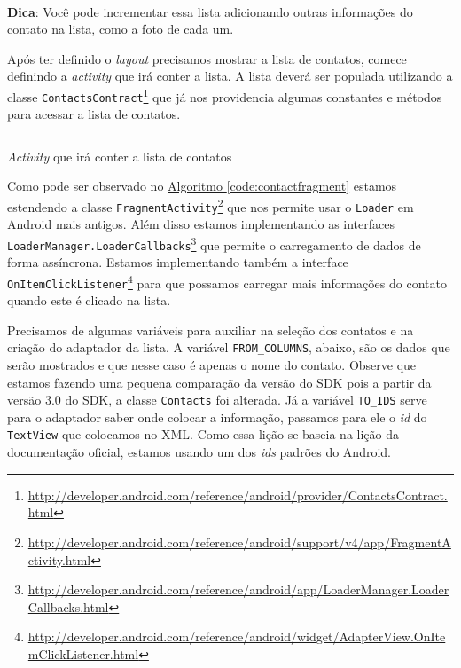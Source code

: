 \documentclass[a4paper,12pt,brazil,oneside]{book}
\begin{document}
\begin{framed}
\paragraph{}\textbf{Dica}: Você pode incrementar essa lista adicionando outras informações do contato na lista, como a foto de cada um.
\textit{}
\end{framed}

	Após ter definido o \emph{layout} precisamos mostrar a lista de contatos, comece definindo a \emph{activity} que irá conter a lista. A lista deverá ser populada utilizando a classe \texttt{ContactsContract}\footnote{\href{http://developer.android.com/reference/android/provider/ContactsContract.html}{http://developer.android.com/reference/android/provider/ContactsContract.html}} que já nos providencia algumas constantes e métodos para acessar a lista de contatos.

		\begin{listing}[H]
		\inputminted[linenos=true,fontsize=\small,frame=lines, framesep=2mm, tabsize=2,numbersep=5pt]{java}{src/api/contacts/fragment.java}
		\caption{\emph{Activity} que irá conter a lista de contatos}
		\label{code:contactfragment}
		\end{listing} 	
	
	Como pode ser observado no \hyperref[code:contactfragment]{Algoritmo \ref*{code:contactfragment}} estamos estendendo a classe \texttt{FragmentActivity}\footnote{\href{http://developer.android.com/reference/android/support/v4/app/FragmentActivity.html}{http://developer.android.com/reference/android/support/v4/app/FragmentActivity.html}} que nos permite usar o \texttt{Loader} em Android mais antigos. Além disso estamos implementando as interfaces \texttt{LoaderManager.LoaderCallbacks}\footnote{\href{http://developer.android.com/reference/android/app/LoaderManager.LoaderCallbacks.html}{http://developer.android.com/reference/android/app/LoaderManager.LoaderCallbacks.html}} que permite o carregamento de dados de forma assíncrona. Estamos implementando também a interface \texttt{OnItemClickListener}\footnote{\href{http://developer.android.com/reference/android/widget/AdapterView.OnItemClickListener.html}{http://developer.android.com/reference/android/widget/AdapterView.OnItemClickListener.html}} para que possamos carregar mais informações do contato quando este é clicado na lista.
	
	Precisamos de algumas variáveis para auxiliar na seleção dos contatos e na criação do adaptador da lista. A variável \texttt{FROM\_COLUMNS}, abaixo, são os dados que serão mostrados e que nesse caso é apenas o nome do contato. Observe que estamos fazendo uma pequena comparação da versão do SDK pois a partir da versão 3.0 do SDK, a classe \texttt{Contacts} foi alterada. Já a variável \texttt{TO\_IDS} serve para o adaptador saber onde colocar a informação, passamos para ele o \emph{id} do \texttt{TextView} que colocamos no XML. Como essa lição se baseia na lição da documentação oficial, estamos usando um dos \emph{ids} padrões do Android.
\end{document}
